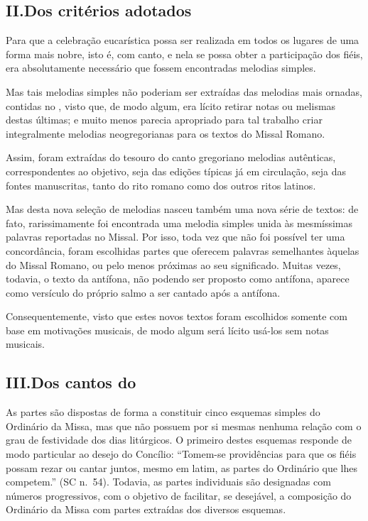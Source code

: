 \subsection{II.\@ Dos critérios adotados}\label{subsection:praenotanda-2}

 Para que a celebração eucarística possa ser realizada em todos os lugares de uma forma mais nobre, isto é, com canto, e nela se possa obter a participação dos fiéis, era absolutamente necessário que fossem encontradas melodias simples.

 Mas tais melodias simples não poderiam ser extraídas das melodias mais ornadas, contidas no {\GR}, visto que, de modo algum, era lícito retirar notas ou melismas destas últimas; e muito menos parecia apropriado para tal trabalho criar integralmente melodias neogregorianas para os textos do Missal Romano.

 Assim, foram extraídas do tesouro do canto gregoriano melodias autênticas, correspondentes ao objetivo, seja das edições típicas já em circulação, seja das fontes manuscritas, tanto do rito romano como dos outros ritos latinos.

 Mas desta nova seleção de melodias nasceu também uma nova série de textos: de fato, rarissimamente foi encontrada uma melodia simples unida às mesmíssimas palavras reportadas no Missal. Por isso, toda vez que não foi possível ter uma concordância, foram escolhidas partes que oferecem palavras semelhantes àquelas do Missal Romano, ou pelo menos próximas ao seu significado. Muitas vezes, todavia, o texto da antífona, não podendo ser proposto como antífona, aparece como versículo do próprio salmo a ser cantado após a antífona.

 Consequentemente, visto que estes novos textos foram escolhidos somente com base em motivações musicais, de modo algum será lícito usá-los sem notas musicais.

\subsection{III.\@ Dos cantos do {\KS}}\label{subsection:praenotanda-3}

 As partes são dispostas de forma a constituir cinco esquemas simples do Ordinário da Missa, mas que não possuem por si mesmas nenhuma relação com o grau de festividade dos dias litúrgicos. O primeiro destes esquemas responde de modo particular ao desejo do Concílio: ``Tomem-se providências para que os fiéis possam rezar ou cantar juntos, mesmo em latim, as partes do Ordinário que lhes competem.'' (SC n.\ 54). Todavia, as partes individuais são designadas com números progressivos, com o objetivo de facilitar, se desejável, a composição do Ordinário da Missa com partes extraídas dos diversos esquemas.

